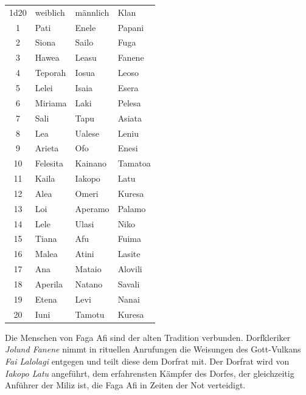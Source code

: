 \documentclass[11pt]{wbzine}
\begin{document}
\begin{multicols}{2}
\begin{tabularx}{\columnwidth}{clll}
    1d20 &  weiblich    &    männlich    &    Klan \\
    1   &    Pati       &     Enele      &     Papani \\
    2    &   Siona      &     Sailo      &     Fuga\\
    3   &    Hawea      &     Leasu      &     Fanene\\
    4    &   Teporah    &     Iosua      &     Leoso\\
    5     &  Lelei      &     Isaia      &     Esera\\
    6     &  Miriama   &      Laki       &     Pelesa\\
    7     &  Sali      &      Tapu       &     Asiata\\
    8     &  Lea       &      Ualese     &     Leniu\\
    9      & Arieta    &      Ofo        &     Enesi\\
    10     & Felesita  &      Kainano    &     Tamatoa\\
    11     & Kaila     &      Iakopo     &     Latu\\
    12    &  Alea      &      Omeri      &     Kuresa\\
    13    &  Loi       &      Aperamo    &     Palamo\\
    14    &  Lele      &      Ulasi      &     Niko\\
    15     & Tiana     &      Afu        &     Fuima\\
    16     & Malea     &      Atini      &     Lasite\\
    17     & Ana       &      Mataio     &     Alovili\\
    18     & Aperila   &      Natano     &     Savali\\
    19     & Etena     &      Levi       &     Nanai\\
    20     & Iuni      &      Tamotu     &     Kuresa\\
\end{tabularx}

    Die Menschen von Faga Afi sind der alten Tradition verbunden.
    Dorfkleriker \textit{Jolund Fanene} nimmt in rituellen
    Anrufungen die Weisungen des Gott-Vulkans \textit{Fai Lalolagi}
    entgegen und teilt diese dem Dorfrat mit. Der Dorfrat wird von
    \textit{Iakopo Latu} angeführt, dem erfahrensten Kämpfer des
    Dorfes, der gleichzeitig Anführer der Miliz ist, die Faga
    Afi in Zeiten der Not verteidigt.


\end{multicols}
\end{document}
